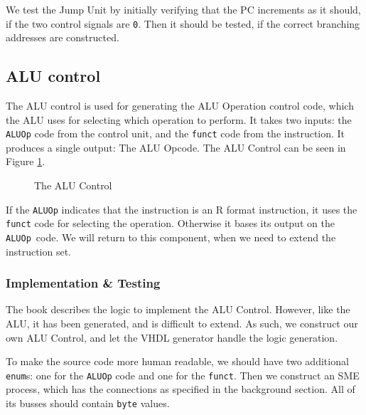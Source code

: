 We test the Jump Unit by initially verifying that the PC increments as it
should, if the two control signals are \texttt{0}. Then it should be tested, if
the correct branching addresses are constructed.

\subsection{ALU control}\label{sec:alu-control}
The ALU control is used for generating the ALU Operation control code, which
the ALU uses for selecting which operation to perform. It takes two inputs: the
\texttt{ALUOp} code from the control unit, and the \texttt{funct} code from the
instruction. It produces a single output: The ALU Opcode. The ALU Control can
be seen in Figure \ref{fig:alu-cont}.
\begin{figure}
    \centering
    \caption{The ALU Control}
    \label{fig:alu-cont}
\end{figure}

If the \texttt{ALUOp} indicates that the instruction is an R format
instruction, it uses the \texttt{funct} code for selecting the operation.
Otherwise it bases its output on the \texttt{ALUOp} code. We will return to
this component, when we need to extend the instruction set.

\subsubsection*{Implementation \& Testing}
The book\cite{ref:ark} describes the logic to implement the ALU Control.
However, like the ALU, it has been generated, and is difficult to extend. As
such, we construct our own ALU Control, and let the VHDL generator handle the
logic generation.

To make the source code more human readable, we should have two additional
\texttt{enum}s: one for the \texttt{ALUOp} code and one for the \texttt{funct}.
Then we construct an SME process, which has the connections as specified in the
background section. All of its busses should contain \texttt{byte} values.

